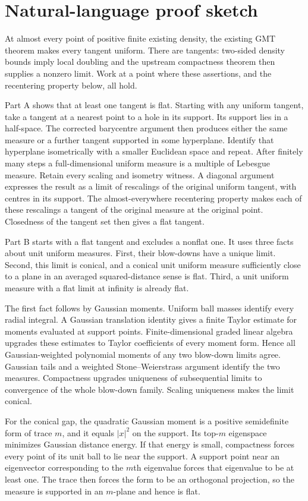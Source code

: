 \section{Natural-language proof sketch}
At almost every point of positive finite existing density, the existing GMT
theorem makes every tangent uniform. There are tangents: two-sided density
bounds imply local doubling and the upstream compactness theorem then supplies
a nonzero limit. Work at a point where these assertions, and the recentering
property below, all hold.

Part A shows that at least one tangent is flat. Starting with any uniform
tangent, take a tangent at a nearest point to a hole in its support. Its support
lies in a half-space. The corrected barycentre argument then produces either
the same measure or a further tangent supported in some hyperplane. Identify
that hyperplane isometrically with a smaller Euclidean space and repeat.
After finitely many steps a full-dimensional uniform measure is a multiple of
Lebesgue measure. Retain every scaling and isometry witness. A diagonal argument
expresses the result as a limit of rescalings of the original uniform tangent,
with centres in its support. The almost-everywhere recentering property makes
each of these rescalings a tangent of the original measure at the original
point. Closedness of the tangent set then gives a flat tangent.

Part B starts with a flat tangent and excludes a nonflat one. It uses three
facts about unit uniform measures. First, their blow-downs have a unique limit.
Second, this limit is conical, and a conical unit uniform measure sufficiently
close to a plane in an averaged squared-distance sense is flat. Third, a unit
uniform measure with a flat limit at infinity is already flat.

The first fact follows by Gaussian moments. Uniform ball masses identify every
radial integral. A Gaussian translation identity gives a finite Taylor estimate
for moments evaluated at support points. Finite-dimensional graded linear
algebra upgrades these estimates to Taylor coefficients of every moment form.
Hence all Gaussian-weighted polynomial moments of any two blow-down limits
agree. Gaussian tails and a weighted Stone--Weierstrass argument identify the
two measures. Compactness upgrades uniqueness of subsequential limits to
convergence of the whole blow-down family. Scaling uniqueness makes the limit
conical.

For the conical gap, the quadratic Gaussian moment is a positive semidefinite
form of trace $m$, and it equals $|x|^2$ on the support. Its top-$m$ eigenspace
minimizes Gaussian distance energy. If that energy is small, compactness forces
every point of its unit ball to lie near the support. A support point near an
eigenvector corresponding to the $m$th eigenvalue forces that eigenvalue to be
at least one. The trace then forces the form to be an orthogonal projection,
so the measure is supported in an $m$-plane and hence is flat.


